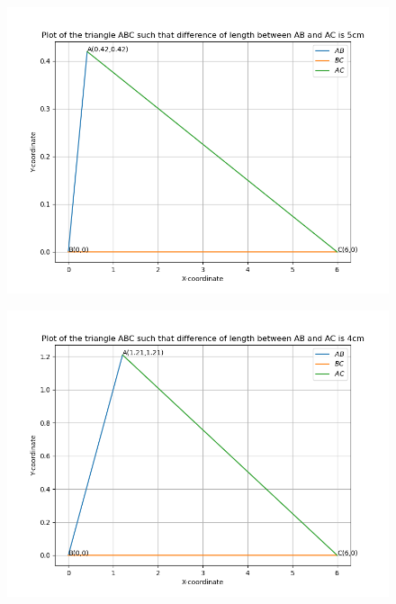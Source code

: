 \documentclass[journal]{IEEEtran}
\begin{document}
\begin{figure}[h]
	\centering
	\includegraphics[scale=0.5]{figs/plot2.png}
	\label{Fig}
\end{figure}
\begin{figure}[h]
	\centering
	\includegraphics[scale=0.5]{figs/plot3.png}
	\label{Fig}
\end{figure}
\end{document}

